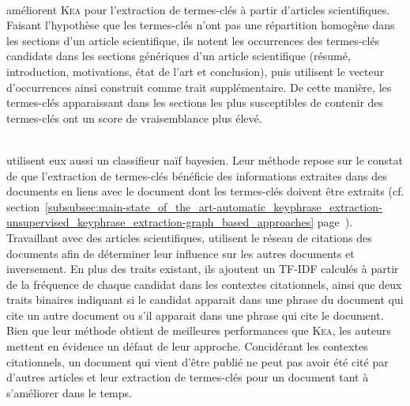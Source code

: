         ~\\ améliorent \textsc{Kea} pour
        l'extraction de termes-clés à partir d'articles scientifiques. Faisant
        l'hypothèse que les termes-clés n'ont pas une répartition homogène dans
        les sections d'un article scientifique, ils notent les occurrences des
        termes-clés candidats dans les sections génériques d'un article
        scientifique (résumé, introduction, motivations, état de l'art et
        conclusion), puis utilisent le vecteur d'occurrences ainsi construit
        comme trait supplémentaire. De cette manière, les termes-clés
        apparaissant dans les sections les plus susceptibles de contenir des
        termes-clés ont un score de vraisemblance plus élevé.
        
        ~\\ utilisent
        eux aussi un classifieur naïf bayesien. Leur méthode repose sur le
        constat de  que l'extraction de termes-clés
        bénéficie des informations extraites dans des documents en liens avec le
        document dont les termes-clés doivent être extraits (cf.
        section~\ref{subsubsec:main-state_of_the_art-automatic_keyphrase_extraction-unsupervised_keyphrase_extraction-graph_based_approaches}
        page~\pageref{subsubsec:main-state_of_the_art-automatic_keyphrase_extraction-unsupervised_keyphrase_extraction-graph_based_approaches}).
        Travaillant avec des articles scientifiques,
         utilisent le
        réseau de citations des documents afin de déterminer leur influence sur
        les autres documents et inversement. En plus des traits existant, ils
        ajoutent un TF-IDF calculés à partir de la fréquence de chaque candidat
        dans les contextes citationnels, ainsi que deux traits binaires
        indiquant si le candidat apparait dans une phrase du document qui cite
        un autre document ou s'il apparait dans une phrase qui cite le document.
        Bien que leur méthode obtient de meilleures performances que
        \textsc{Kea}, les
        auteurs mettent en évidence un défaut de leur approche. Concidérant les
        contextes citationnels, un document qui vient d'être publié ne peut pas
        avoir été cité par d'autres articles et leur extraction de termes-clés
        pour un document tant à s'améliorer dans le temps.

